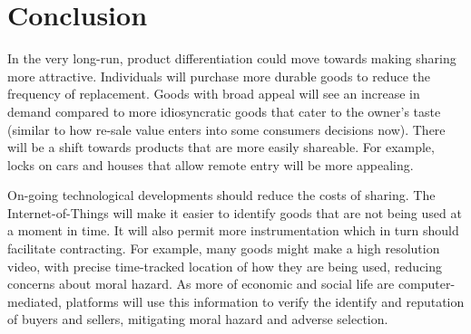 \documentclass[11pt]{article}
\begin{document}





\section{Conclusion}
In the very long-run, product differentiation could move towards making sharing more attractive. 
Individuals will purchase more durable goods to reduce the frequency of replacement. 
Goods with broad appeal will see an increase in demand compared to more idiosyncratic goods that cater to the owner's taste (similar to how re-sale value enters into some consumers decisions now). 
There will be a shift towards products that are more easily shareable. 
For example, locks on cars and houses that allow remote entry will be more appealing. 

On-going technological developments should reduce the costs of sharing. 
The Internet-of-Things will make it easier to identify goods that are not being used at a moment in time. 
It will also permit more instrumentation which in turn should facilitate contracting. 
For example, many goods might make a high resolution video, with precise time-tracked location of how they are being used, reducing concerns about moral hazard. 
As more of economic and social life are computer-mediated, platforms will use this information to verify the identify and reputation of buyers and sellers, mitigating moral hazard and adverse selection.  
\end{document}
